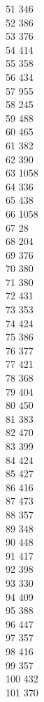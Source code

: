 { 51	346 \\
 52	386 \\
 53	376 \\
 54	414 \\
 55	358 \\
 56	434 \\
 57	955 \\
 58	245 \\
 59	488 \\
 60	465 \\
 61	382 \\
 62	390 \\
 63	1058 \\
 64	336 \\
 65	438 \\
 66	1058 \\
 67	28 \\
 68	204 \\
 69	376 \\
 70	380 \\
 71	380 \\
 72	431 \\
 73	353 \\
 74	424 \\
 75	386 \\
 76	377 \\
 77	421 \\
 78	368 \\
 79	404 \\
 80	450 \\
 81	383 \\
 82	470 \\
 83	399 \\
 84	424 \\
 85	427 \\
 86	416 \\
 87	473 \\
 88	357 \\
 89	348 \\
 90	448 \\
 91	417 \\
 92	398 \\
 93	330 \\
 94	409 \\
 95	388 \\
 96	447 \\
 97	357 \\
 98	416 \\
 99	357 \\
 100	432 \\
 101	370 \\
}
